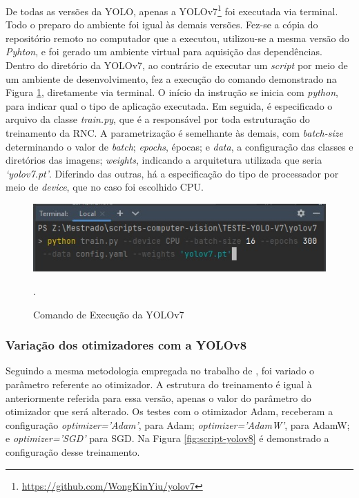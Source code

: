 De todas as versões da YOLO, apenas a YOLOv7\footnote{\url{https://github.com/WongKinYiu/yolov7}} foi executada via terminal. Todo o preparo do ambiente foi igual às demais versões. Fez-se a cópia do repositório remoto no computador que a executou, utilizou-se a mesma versão do \textit{Pyhton}, e foi gerado um ambiente virtual para aquisição das dependências. Dentro do diretório da YOLOv7, ao contrário de executar um \textit{script} por meio de um ambiente de desenvolvimento, fez a execução do comando demonstrado na Figura \ref{fig:script-yolov7}, diretamente via terminal. O início da instrução se inicia com \textit{python}, para indicar qual o tipo de aplicação executada. Em seguida, é especificado o arquivo da classe \textit{train.py}, que é a responsável por toda estruturação do treinamento da RNC.  A parametrização é semelhante às demais, com \textit{batch-size} determinando o valor de \textit{batch}; \textit{epochs}, épocas; e \textit{data}, a configuração das classes e diretórios das imagens; \textit{weights}, indicando a arquitetura utilizada que seria \textit{‘yolov7.pt’}. Diferindo das outras, há a especificação do tipo de processador por meio de \textit{device}, que no caso foi escolhido CPU.

\begin{figure}[!h]
    \centering
    \begin{minipage}{0.7\linewidth}
    \centering
    \captionsetup{justification=centering,margin=0.5cm,font=small}
    \includegraphics[width=1\linewidth]{img/cap5/script-yolov7.jpg}
    \caption{Comando de Execução da YOLOv7}.
    \label{fig:script-yolov7}
    \end{minipage}
\end{figure}

\subsubsection{Variação dos otimizadores com a YOLOv8}

Seguindo a mesma metodologia empregada no trabalho de \cite{gonzaga2023identificaccao}, foi variado o parâmetro referente ao otimizador. A estrutura do treinamento é igual à anteriormente referida para essa versão, apenas o valor do parâmetro do otimizador que será alterado. Os testes com o otimizador Adam, receberam a configuração \textit{optimizer=’Adam’}, para Adam; \textit{optimizer=’AdamW’}, para AdamW; e \textit{optimizer=’SGD’} para SGD. Na Figura \ref{fig:script-yolov8} é demonstrado a configuração desse treinamento.

